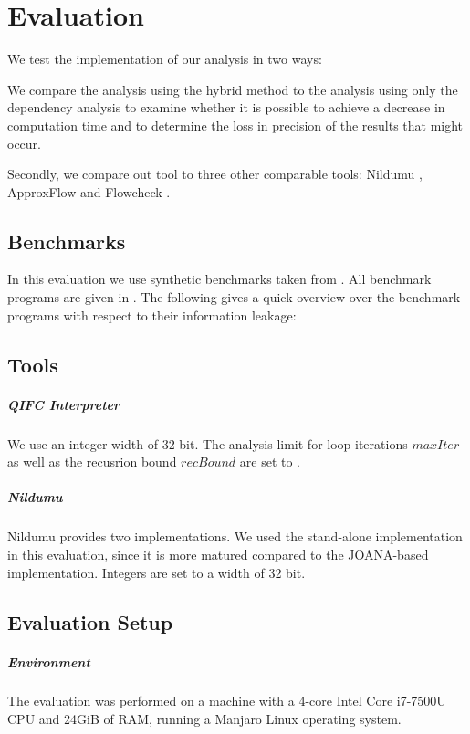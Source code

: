 \chapter{Evaluation}\label{sec:eval}
We test the implementation of our analysis in two ways:

We compare the analysis using the hybrid method to the analysis using only the dependency analysis to examine whether it is possible to achieve a decrease in computation time and to determine the loss in precision of the results that might occur.

Secondly, we compare out tool to three other comparable tools: Nildumu \cite{bechberger18}, ApproxFlow \cite{biondi18} and Flowcheck \cite{mccamant08}.

\section{Benchmarks}
In this evaluation we use synthetic benchmarks taken from . All benchmark programs are given in . The following gives a quick overview over the benchmark programs with respect to their information leakage:

\section{Tools}

\paragraph{QIFC Interpreter}
We use an integer width of 32 bit. The analysis limit for loop iterations $maxIter$ as well as the recusrion bound $recBound$ are set to .

\paragraph{Nildumu}
Nildumu provides two implementations. We used the stand-alone implementation in this evaluation, since it is more matured compared to the JOANA-based implementation. Integers are set to a width of 32 bit.

\section{Evaluation Setup}

\paragraph{Environment}
The evaluation was performed on a machine with a 4-core Intel Core i7-7500U CPU and 24GiB of RAM, running a Manjaro Linux operating system.


